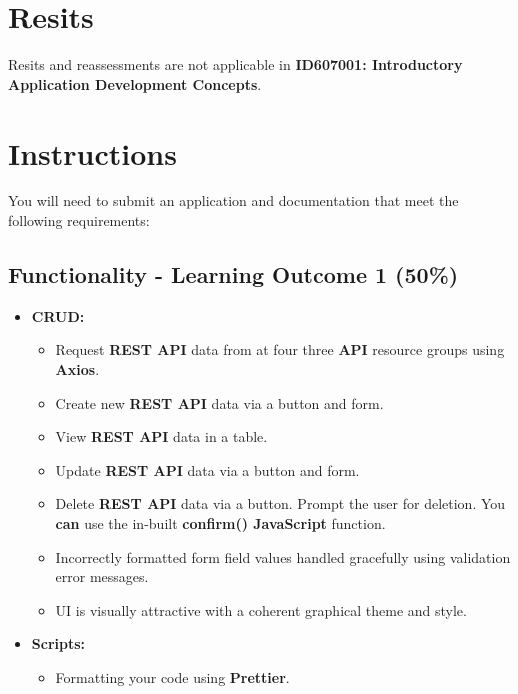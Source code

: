 \documentclass{article}
\begin{document}
\section*{Resits}
Resits and reassessments are not applicable in \textbf{ID607001: Introductory Application Development Concepts}. 
\newpage

\section*{Instructions}
You will need to submit an application and documentation that meet the following requirements: 

\subsection*{Functionality - Learning Outcome 1 (50\%)}
\begin{itemize}
	\item \textbf{CRUD:}
		\begin{itemize}
		\item Request \textbf{REST API} data from at four three \textbf{API} resource groups using \textbf{Axios}.
		\item Create new \textbf{REST API} data via a button and form. 
		\item View \textbf{REST API} data in a table.
		\item Update \textbf{REST API} data via a button and form. 
		\item Delete \textbf{REST API} data via a button.
		Prompt the user for deletion. You \textbf{can} use the in-built \textbf{confirm() JavaScript} function. 
		\item Incorrectly formatted form field values handled gracefully using validation error messages.
		\item UI is visually attractive with a coherent graphical theme and style.	
	\end{itemize}
	\item \textbf{Scripts:}
	\begin{itemize}
		\item Formatting your code using \textbf{Prettier}.
	\end{itemize}
\end{itemize}
\end{document}
